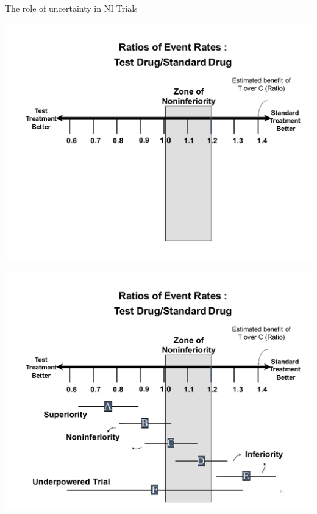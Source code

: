 \documentclass[ignorenonframetext,]{beamer}
\begin{document}
\begin{frame}{%
\protect\hypertarget{the-role-of-uncertainty-in-ni-trials}{%
The role of uncertainty in NI Trials}}

\includegraphics{ni_ci_rr_empty.pdf}

\end{frame}

\begin{frame}{%
\protect\hypertarget{section}{%
}}

\includegraphics{ni_ci_rr_full.pdf}

\end{frame}
\end{document}
